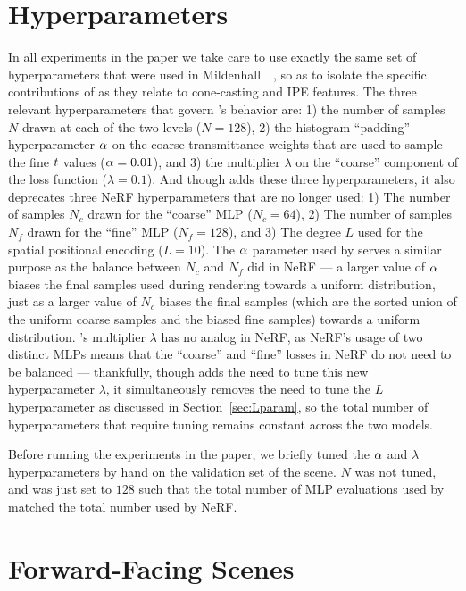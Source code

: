 \documentclass[10pt,twocolumn,letterpaper]{article}
\begin{document}
\section{Hyperparameters}

In all experiments in the paper we take care to use exactly the same set of hyperparameters that were used in Mildenhall~\etal~\cite{mildenhall2020}, so as to isolate the specific contributions of \shortmodelnamelower as they relate to cone-casting and IPE features. The three relevant hyperparameters that govern \shortmodelnamelower's behavior are: 1) the number of samples $N$ drawn at each of the two levels ($N=128$), 2) the histogram ``padding'' hyperparameter $\alpha$ on the coarse transmittance weights that are used to sample the fine $t$ values ($\alpha=0.01$), and 3) the multiplier $\lambda$ on the ``coarse'' component of the loss function ($\lambda=0.1$). And though \shortmodelnamelower adds these three hyperparameters, it also deprecates three NeRF hyperparameters that are no longer used: 1) The number of samples $N_c$ drawn for the ``coarse'' MLP ($N_c=64$), 2) The number of samples $N_f$ drawn for the ``fine'' MLP ($N_f=128$), and 3) The degree $L$ used for the spatial positional encoding ($L=10$). The $\alpha$ parameter used by \shortmodelnamelower serves a similar purpose as the balance between $N_c$ and $N_f$ did in NeRF --- a larger value of $\alpha$ biases the final samples used during rendering towards a uniform distribution, just as a larger value of $N_c$ biases the final samples (which are the sorted union of the uniform coarse samples and the biased fine samples) towards a uniform distribution. \shortmodelname's multiplier $\lambda$ has no analog in NeRF, as NeRF's usage of two distinct MLPs means that the ``coarse'' and ``fine'' losses in NeRF do not need to be balanced --- thankfully, though \shortmodelnamelower adds the need to tune this new hyperparameter $\lambda$, it simultaneously removes the need to tune the $L$ hyperparameter as discussed in Section~\ref{sec:Lparam}, so the total number of hyperparameters that require tuning remains constant across the two models.

Before running the experiments in the paper, we briefly tuned the $\alpha$ and $\lambda$ hyperparameters by hand on the validation set of the  scene. $N$ was not tuned, and was just set to $128$ such that the total number of MLP evaluations used by \shortmodelnamelower matched the total number used by NeRF.

\section{Forward-Facing Scenes}
\end{document}
